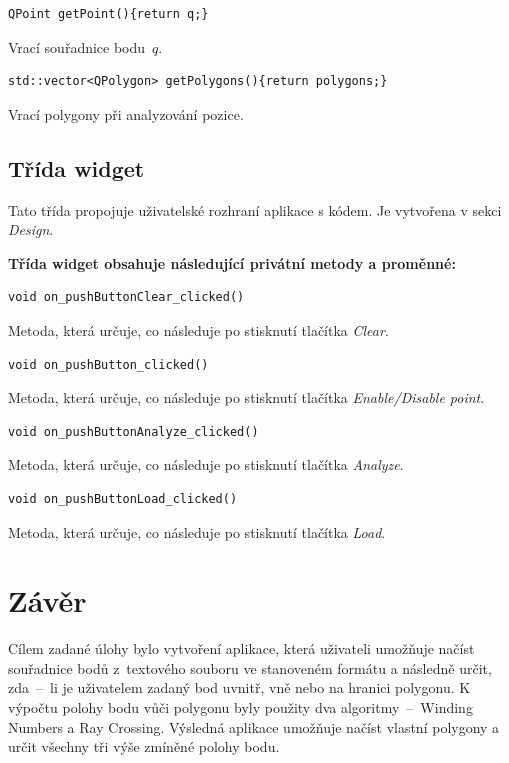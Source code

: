 \documentclass[a4paper, 12pt, oneside, titlepage]{article} %
\begin{document}
\begin{verbatim}
QPoint getPoint(){return q;}
\end{verbatim}
Vrací souřadnice bodu~$q$.\\

\begin{verbatim}
std::vector<QPolygon> getPolygons(){return polygons;}
\end{verbatim}
Vrací polygony při analyzování pozice.\\

\subsection{Třída widget}
Tato třída propojuje uživatelské rozhraní aplikace s kódem. Je vytvořena v sekci \emph{Design}.

\textbf{Třída widget obsahuje následující privátní metody a proměnné:}
\begin{verbatim}
void on_pushButtonClear_clicked()
\end{verbatim}
Metoda, která určuje, co následuje po stisknutí tlačítka \emph{Clear}.\\

\begin{verbatim}
void on_pushButton_clicked()
\end{verbatim}
Metoda, která určuje, co následuje po stisknutí tlačítka \emph{Enable/Disable point}.\\

\begin{verbatim}
void on_pushButtonAnalyze_clicked()
\end{verbatim}
Metoda, která určuje, co následuje po stisknutí tlačítka \emph{Analyze}.\\

\begin{verbatim}
void on_pushButtonLoad_clicked()
\end{verbatim}
Metoda, která určuje, co následuje po stisknutí tlačítka \emph{Load}.\\


\section{Závěr}
Cílem zadané úlohy bylo vytvoření aplikace, která uživateli umožňuje načíst souřadnice bodů z~textového souboru ve stanoveném formátu a následně určit, zda~--~li je uživatelem zadaný bod uvnitř, vně nebo na hranici polygonu. K výpočtu polohy bodu vůči polygonu byly použity dva algoritmy~--~Winding Numbers a Ray Crossing. Výsledná aplikace umožňuje načíst vlastní polygony a určit všechny tři výše zmíněné polohy bodu.
\end{document}
